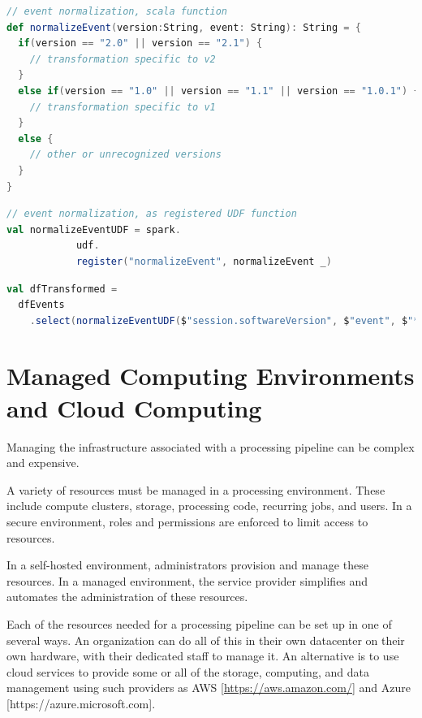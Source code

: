 \documentclass[runningheads,a4paper]{llncs}
\begin{document}
\begin{lstlisting}[language=Scala, basicstyle = \small, caption={Defining a function to conditionally process events based on version.}]
// event normalization, scala function
def normalizeEvent(version:String, event: String): String = {
  if(version == "2.0" || version == "2.1") {
  	// transformation specific to v2
  }
  else if(version == "1.0" || version == "1.1" || version == "1.0.1") {
  	// transformation specific to v1
  }
  else {
	// other or unrecognized versions
  }
}
\end{lstlisting}


\begin{lstlisting}[language=Scala, basicstyle = \small, caption={Registering a function as a UDF for event processing in SparkSQL}]
// event normalization, as registered UDF function
val normalizeEventUDF = spark.
			udf.
			register("normalizeEvent", normalizeEvent _)
\end{lstlisting}


\begin{lstlisting}[language=Scala, basicstyle = \small, caption={Applying the UDF to transform events in a dataframe}]
val dfTransformed = 
  dfEvents
    .select(normalizeEventUDF($"session.softwareVersion", $"event", $"*")
\end{lstlisting}

\section{Managed Computing Environments and Cloud Computing}

Managing the infrastructure associated with a processing pipeline can be complex and expensive.

A variety of resources must be managed in a processing environment. These include compute clusters, storage, processing code, recurring jobs, and users. In a secure environment, roles and permissions are enforced to limit access to resources. 

In a self-hosted environment, administrators provision and manage these resources. In a managed environment, the service provider simplifies and automates the administration of these resources.

Each of the resources needed for a processing pipeline can be set up in one of several ways. An organization can do all of this in their own datacenter on their own hardware, with their dedicated staff to manage it.  An alternative is to use cloud services to provide some or all of the storage, computing, and data management using such providers as AWS [\url{https://aws.amazon.com/}] and Azure [{https://azure.microsoft.com}]. 
\end{document}
